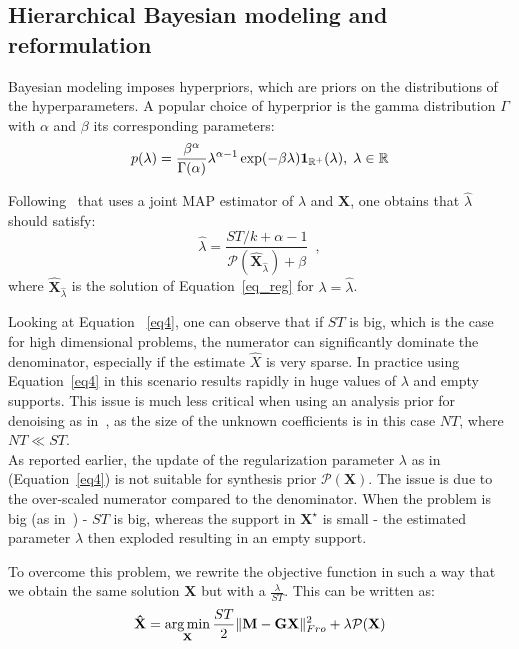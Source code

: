 \subsection{Hierarchical Bayesian modeling and reformulation}

Bayesian modeling imposes hyperpriors, which are priors on the distributions of the hyperparameters. A popular choice of hyperprior is the gamma distribution $\Gamma$ with $\alpha$ and $\beta$ its corresponding parameters:
\begin{equation} \label{eq3}
	p(\lambda) = \frac{\beta^\alpha}{\Gamma(\alpha)}\lambda^{\alpha-1}\exp(-\beta\lambda)\mathbf{1}_{\mathbb{R}^+}(\lambda), \; \lambda \in \mathbb{R}
\end{equation}

Following~\cite{Figueiredo} that uses a joint MAP estimator of $\lambda$ and $\mathbf{X}$, one obtains that $\hat{\lambda}$ should satisfy:
\begin{equation} \label{eq4}
	\hat{\lambda} = \frac{ST/k + \alpha - 1}{\mathcal{P}(\mathbf{\hat{X}}_{\hat{\lambda}}) + \beta} \enspace ,
\end{equation}
where $\mathbf{\hat{X}}_{\hat{\lambda}}$ is the solution of Equation~\eqref{eq_reg} for $\lambda = \hat{\lambda}$.

Looking at Equation~ \eqref{eq4}, one can observe that if $ST$ is big, which is the case for high dimensional problems, the numerator can significantly dominate the denominator, especially if the estimate $\hat{X}$ is very sparse.
In practice using Equation~\eqref{eq4} in this scenario results rapidly in huge values of $\lambda$ and empty supports. This issue is much less critical when using an analysis prior for denoising as in~\cite{Figueiredo}, as the size of the unknown coefficients is in this case $NT$, where $NT \ll ST$.\\

As reported earlier, the update of the regularization parameter $\lambda$ as in (Equation~\eqref{eq4}) is not suitable for synthesis prior $\mathcal{P}(\mathbf{X})$. The issue is due to the over-scaled numerator compared to the denominator. When the problem is big (as in~\cite{Figueiredo}) - $ST$ is big, whereas the support in $\mathbf{X}^\star$ is small - the estimated parameter $\lambda$ then exploded resulting in an empty support.

To overcome this problem, we rewrite the objective function in such a way that we obtain the same solution $\mathbf{X}$ but with a $\frac{\lambda}{ST}$. This can be written as:
\begin{equation} \label{eq5}
    \mathbf{\hat{X}} = \mathop{\mathrm{arg}\,\mathrm{min}}_{\mathbf{X}} \frac{ST}{2}\|\mathbf{M - GX}\|^2_{Fro} + \lambda\mathcal{P}(\mathbf{X})
\end{equation}

